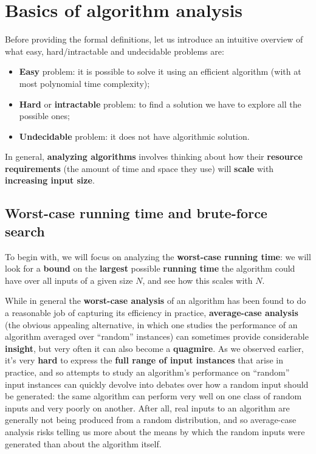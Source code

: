 \section{Basics of algorithm analysis}\label{ch2}
Before providing the formal definitions, let us introduce an intuitive overview of what easy, hard/intractable and undecidable problems are:

\begin{itemize}
    \item \textbf{Easy} problem: it is possible to solve it using an efficient algorithm (with at most polynomial time complexity);
    \item \textbf{Hard} or \textbf{intractable} problem: to find a solution we have to explore all the possible ones;
    \item \textbf{Undecidable} problem: it does not have algorithmic solution.
\end{itemize}

In general, \textbf{analyzing algorithms} involves thinking about how their \textbf{resource requirements} (the amount of time and space they use) will \textbf{scale} with \textbf{increasing input size}.

\subsection{Worst-case running time and brute-force search}
To begin with, we will focus on analyzing the \textbf{worst-case running time}: we will look for a \textbf{bound} on the \textbf{largest} possible \textbf{running time} the algorithm could have over all inputs of a given size $N$, and see how this scales with $N$. 

While in general the \textbf{worst-case analysis} of an algorithm has been found to do a reasonable job of capturing its efficiency in practice, \textbf{average-case analysis} (the obvious appealing alternative, in which one studies the performance of an algorithm averaged over “random” instances) can sometimes provide considerable \textbf{insight}, but very often it can also become a \textbf{quagmire}. As we observed earlier, it’s very \textbf{hard} to express the \textbf{full range of input instances} that arise in practice, and so attempts to study an algorithm’s performance on “random” input instances can quickly devolve into debates over how a random input should be generated: the same algorithm can perform very well on one class of random inputs and very poorly on another. After all, real inputs to an algorithm are generally not being produced from a random distribution, and so average-case analysis risks telling us more about the means by which the random inputs were generated than about the algorithm itself.

